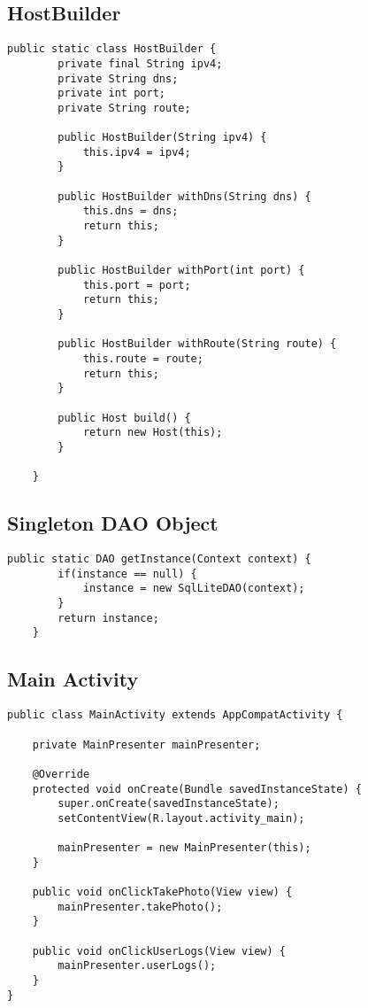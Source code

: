 \subsection*{HostBuilder}
\begin{lstlisting}[style=Java]
	public static class HostBuilder {
        private final String ipv4;
        private String dns;
        private int port;
        private String route;

        public HostBuilder(String ipv4) {
            this.ipv4 = ipv4;
        }

        public HostBuilder withDns(String dns) {
            this.dns = dns;
            return this;
        }

        public HostBuilder withPort(int port) {
            this.port = port;
            return this;
        }

        public HostBuilder withRoute(String route) {
            this.route = route;
            return this;
        }

        public Host build() {
            return new Host(this);
        }

    }
\end{lstlisting}


\subsection*{Singleton DAO Object}
\begin{lstlisting}[style=Java]
	public static DAO getInstance(Context context) {
        if(instance == null) {
            instance = new SqlLiteDAO(context);
        }
        return instance;
    }
\end{lstlisting}


\subsection*{Main Activity}
\begin{lstlisting}[style=Java]
public class MainActivity extends AppCompatActivity {

    private MainPresenter mainPresenter;

    @Override
    protected void onCreate(Bundle savedInstanceState) {
        super.onCreate(savedInstanceState);
        setContentView(R.layout.activity_main);

        mainPresenter = new MainPresenter(this);
    }

    public void onClickTakePhoto(View view) {
        mainPresenter.takePhoto();
    }

    public void onClickUserLogs(View view) {
        mainPresenter.userLogs();
    }
}
\end{lstlisting}


